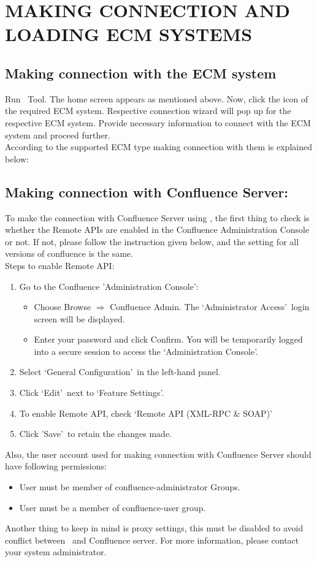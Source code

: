 \section{MAKING CONNECTION AND LOADING ECM SYSTEMS}
\subsection{Making connection with the ECM system}
Run \appName\ Tool. The home screen appears as mentioned above. Now, click the icon of the required ECM system. Respective connection wizard will pop up for the respective ECM system. Provide necessary information to connect with the ECM system and proceed further.\\
According to the supported ECM type making connection with them is explained below:
\subsection*{Making connection with Confluence Server:}
To make the connection with Confluence Server using \appName, the first thing to check is whether the Remote APIs are enabled in the Confluence Administration Console or not. If not, please follow the instruction given below, and the setting for all versions of confluence is the same.\\
Steps to enable Remote API:
\begin{enumerate}
	\item Go to the Confluence 'Administration Console':
	\begin{itemize}
		\item Choose Browse $\Rightarrow$ Confluence Admin. The \lq Administrator Access\rq\ login screen will be displayed.
		\item Enter your password and click Confirm. You will be temporarily logged into a secure session to access the \lq Administration Console\rq.		
	\end{itemize}
	\item Select \lq General Configuration\rq\ in the left-hand panel.
	\item Click \lq Edit\rq\ next to \lq Feature Settings\rq.
	\item To enable Remote API, check \lq Remote API (XML-RPC \& SOAP)\rq
	\item Click \rq Save\rq\ to retain the changes made.
\end{enumerate}
	Also, the user account used for making connection with Confluence Server should have following permissions:
	\begin{itemize}
		\item User must be member of confluence-administrator Groups.
		\item User must be a member of confluence-user group.
	\end{itemize}
Another thing to keep in mind is proxy settings, this must be disabled to avoid conflict between \appName\ and Confluence server. For more information, please contact your system administrator.
